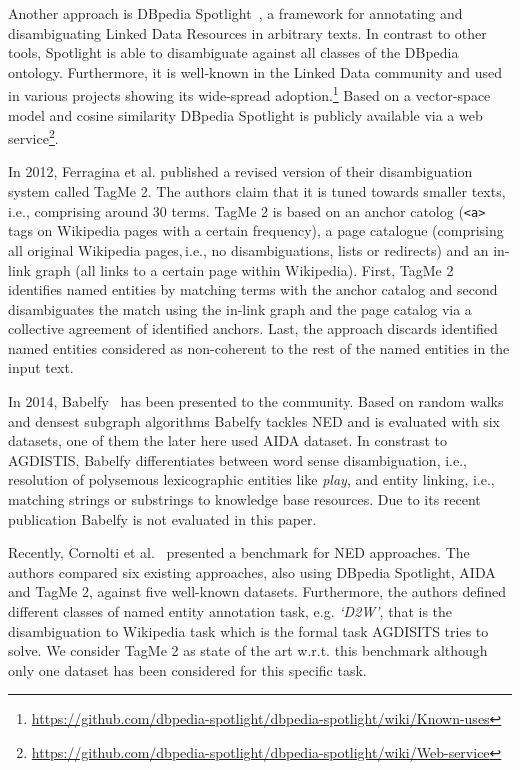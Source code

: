 Another approach is DBpedia Spotlight~\cite{spotlight}, a framework for annotating and disambiguating Linked Data Resources in arbitrary texts.
In contrast to other tools, Spotlight is able to disambiguate against all classes of the DBpedia ontology.
Furthermore, it is well-known in the Linked Data community and used in various projects showing its wide-spread adoption.\footnote{\url{https://github.com/dbpedia-spotlight/dbpedia-spotlight/wiki/Known-uses}}
Based on a vector-space model and cosine similarity DBpedia Spotlight is publicly available via a web service\footnote{\url{https://github.com/dbpedia-spotlight/dbpedia-spotlight/wiki/Web-service}}.

In 2012, Ferragina et al. published a revised version of their disambiguation system called TagMe 2.
The authors claim that it is tuned towards smaller texts,\,i.e., comprising around 30 terms.
TagMe 2 is based on an anchor catolog (\texttt{<a>} tags on Wikipedia pages with a certain frequency), a page catalogue (comprising all original Wikipedia pages,\,i.e., no disambiguations, lists or redirects) and an in-link graph (all links to a certain page within Wikipedia).
First, TagMe 2 identifies named entities by matching terms with the anchor catalog and second disambiguates the match using the in-link graph and the page catalog via a collective agreement of identified anchors. 
Last, the approach discards identified named entities considered as non-coherent to the rest of the named entities in the input text.  

In 2014, Babelfy~\cite{babelfy} has been presented to the community.
Based on random walks and densest subgraph algorithms Babelfy tackles \ac{NED} and is evaluated with six datasets, one of them the later here used AIDA dataset. 
In constrast to AGDISTIS, Babelfy differentiates between word sense disambiguation, i.e., resolution of polysemous lexicographic entities like \emph{play}, and entity linking, i.e., matching strings or substrings to knowledge base resources.
Due to its recent publication Babelfy is not evaluated in this paper.

Recently, Cornolti et al.~\cite{cornolti} presented a benchmark for \ac{NED} approaches.
The authors compared six existing approaches, also using DBpedia Spotlight, AIDA and TagMe 2, against five well-known datasets. %
Furthermore, the authors defined different classes of named entity annotation task, e.g. \emph{`D2W'}, that is the disambiguation to Wikipedia task which is the formal task AGDISITS tries to solve.
We consider TagMe 2 as state of the art w.r.t. this benchmark although only one dataset has been considered for this specific task.


